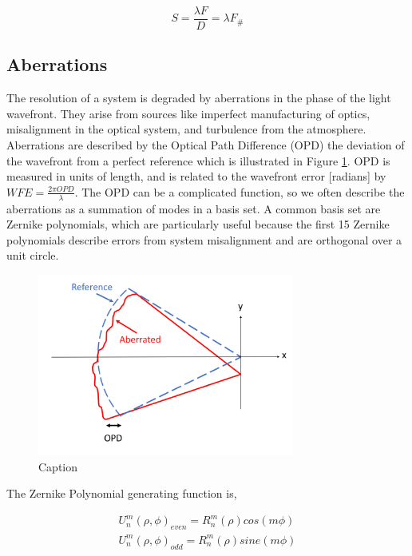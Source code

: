 \begin{equation}
S=\frac{ \lambda F}{D} = \lambda F_\#
\end{equation}

\subsection{Aberrations}

The resolution of a system is degraded by aberrations in the phase of the light wavefront. They arise from sources like imperfect manufacturing of optics, misalignment in the optical system, and turbulence from the atmosphere. Aberrations are described by the Optical Path Difference (OPD) the deviation of the wavefront from a perfect reference which is illustrated in Figure \ref{fig:OPD}. OPD is measured in units of length, and is related to the wavefront error [radians] by $WFE=\frac{2\pi OPD}{\lambda}$. The OPD can be a complicated function, so we often describe the aberrations as a summation of modes in a basis set. A common basis set are Zernike polynomials, which are particularly useful because the first 15 Zernike polynomials describe errors from system misalignment and are orthogonal over a unit circle. 

\begin{figure}
    \centering
    \includegraphics[width=0.75\textwidth]{Chapter Materials/Introduction Materials/Introduction Figures/OPD.png}
    \caption{Caption}
    \label{fig:OPD}
\end{figure}

The Zernike Polynomial generating function is,

\begin{equation}
    \begin{split}
        U_n^m(\rho,\phi)_{even}=R_n^m(\rho)cos(m\phi) \\
        U_n^m(\rho,\phi)_{odd}=R_n^m(\rho)sine(m\phi)
    \end{split}
\end{equation}

